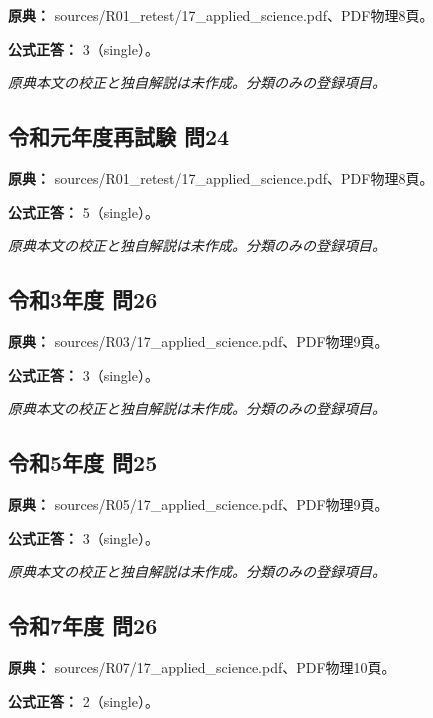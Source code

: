 \noindent\textbf{原典：} sources/R01\_retest/17\_applied\_science.pdf、PDF物理8頁。

\textbf{公式正答：} 3（single）。

\par\textit{原典本文の校正と独自解説は未作成。分類のみの登録項目。}

\subsection{令和元年度再試験 問24}
\label{q:r01-ret-applied-24}

\noindent\textbf{原典：} sources/R01\_retest/17\_applied\_science.pdf、PDF物理8頁。

\textbf{公式正答：} 5（single）。

\par\textit{原典本文の校正と独自解説は未作成。分類のみの登録項目。}

\subsection{令和3年度 問26}
\label{q:r03-reg-applied-26}

\noindent\textbf{原典：} sources/R03/17\_applied\_science.pdf、PDF物理9頁。

\textbf{公式正答：} 3（single）。

\par\textit{原典本文の校正と独自解説は未作成。分類のみの登録項目。}

\subsection{令和5年度 問25}
\label{q:r05-reg-applied-25}

\noindent\textbf{原典：} sources/R05/17\_applied\_science.pdf、PDF物理9頁。

\textbf{公式正答：} 3（single）。

\par\textit{原典本文の校正と独自解説は未作成。分類のみの登録項目。}

\subsection{令和7年度 問26}
\label{q:r07-reg-applied-26}

\noindent\textbf{原典：} sources/R07/17\_applied\_science.pdf、PDF物理10頁。

\textbf{公式正答：} 2（single）。

